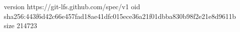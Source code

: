 version https://git-lfs.github.com/spec/v1
oid sha256:443f6d42c66e457fad18ae41dfc015ece36a21f01dbba830b98f2e21e8d9611b
size 214723
